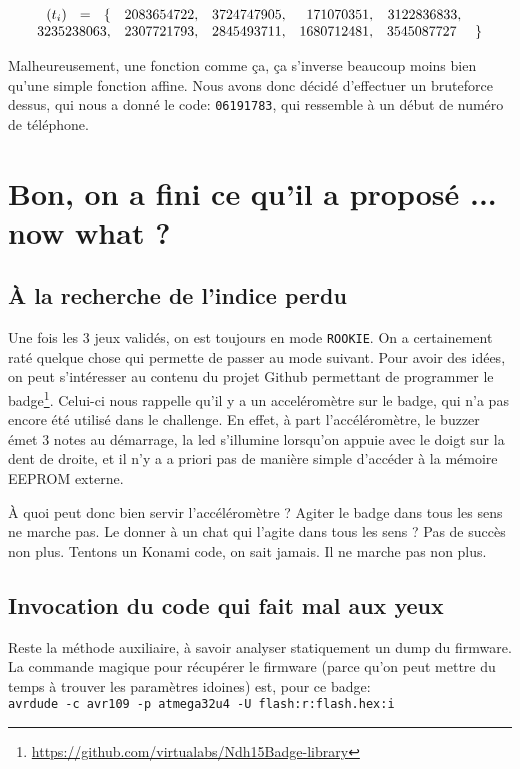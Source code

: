 \documentclass[11pt]{article}
\newcommand{\ttt}[1]{\texttt{#1}}
\begin{document}
\[
\begin{array}{crrrrrl}
\hfill (t_i) \hfill = \hfill\{& 2083654722,& 3724747905,& 171070351,& 3122836833,&\\
3235238063, &2307721793,& 2845493711,& 1680712481,& 3545087727\ &\}
\end{array}
\]

Malheureusement, une fonction comme ça, ça s'inverse beaucoup moins bien qu'une simple fonction affine. Nous avons donc décidé d'effectuer un bruteforce dessus, qui nous a donné le code: \ttt{06191783}, qui ressemble à un début de numéro de téléphone.

  \section{Bon, on a fini ce qu'il a proposé ... now what ?}

    \subsection{À la recherche de l'indice perdu}

    Une fois les 3 jeux validés, on est toujours en mode \ttt{ROOKIE}. On a certainement raté quelque chose qui permette de passer au mode suivant. Pour avoir des idées, on peut s'intéresser au contenu du projet Github permettant de programmer le badge\footnote{\url{https://github.com/virtualabs/Ndh15Badge-library}}. Celui-ci nous rappelle qu'il y a un acceléromètre sur le badge, qui n'a pas encore été utilisé dans le challenge. En effet, à part l'accéléromètre, le buzzer émet 3 notes au démarrage, la led s'illumine lorsqu'on appuie avec le doigt sur la dent de droite, et il n'y a a priori pas de manière simple d'accéder à la mémoire EEPROM externe.

    À quoi peut donc bien servir l'accéléromètre ? Agiter le badge dans tous les sens ne marche pas. Le donner à un chat qui l'agite dans tous les sens ? Pas de succès non plus. Tentons un Konami code, on sait jamais. Il ne marche pas non plus.

    \subsection{Invocation du code qui fait mal aux yeux}

    Reste la méthode auxiliaire, à savoir analyser statiquement un dump du firmware. La commande magique pour récupérer le firmware (parce qu'on peut mettre du temps à trouver les paramètres idoines) est, pour ce badge: \\
  \ttt{avrdude -c avr109 -p atmega32u4 -U flash:r:flash.hex:i}
\end{document}
